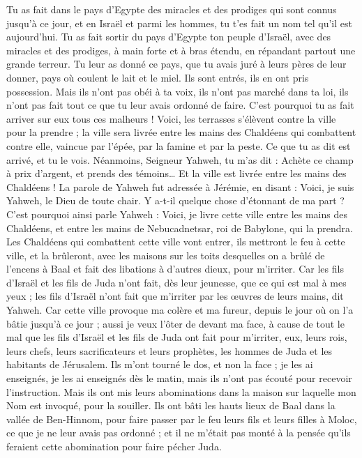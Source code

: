 \begin{multicols}{2}
Tu as fait dans le pays d'Egypte des miracles et des prodiges qui sont connus jusqu'à ce jour, et en Israël et parmi les hommes, tu t'es fait un nom tel qu'il est aujourd'hui.
Tu as fait sortir du pays d'Egypte ton peuple d'Israël, avec des miracles et des prodiges, à main forte et à bras étendu, en répandant partout une grande terreur.
Tu leur as donné ce pays, que tu avais juré à leurs pères de leur donner, pays où coulent le lait et le miel.
Ils sont entrés, ils en ont pris possession. Mais ils n'ont pas obéi à ta voix, ils n'ont pas marché dans ta loi, ils n'ont pas fait tout ce que tu leur avais ordonné de faire. C'est pourquoi tu as fait arriver sur eux tous ces malheurs !
Voici, les terrasses s'élèvent contre la ville pour la prendre ; la ville sera livrée entre les mains des Chaldéens qui combattent contre elle, vaincue par l'épée, par la famine et par la peste. Ce que tu as dit est arrivé, et tu le vois.
Néanmoins, Seigneur Yahweh, tu m'as dit : Achète ce champ à prix d'argent, et prends des témoins… Et la ville est livrée entre les mains des Chaldéens !
La parole de Yahweh fut adressée à Jérémie, en disant :
Voici, je suis Yahweh, le Dieu de toute chair. Y a-t-il quelque chose d'étonnant de ma part ?
C'est pourquoi ainsi parle Yahweh : Voici, je livre cette ville entre les mains des Chaldéens, et entre les mains de Nebucadnetsar, roi de Babylone, qui la prendra.
Les Chaldéens qui combattent cette ville vont entrer, ils mettront le feu à cette ville, et la brûleront, avec les maisons sur les toits desquelles on a brûlé de l'encens à Baal et fait des libations à d'autres dieux, pour m'irriter.
Car les fils d'Israël et les fils de Juda n'ont fait, dès leur jeunesse, que ce qui est mal à mes yeux ; les fils d'Israël n'ont fait que m'irriter par les œuvres de leurs mains, dit Yahweh.
Car cette ville provoque ma colère et ma fureur, depuis le jour où on l'a bâtie jusqu'à ce jour ; aussi je veux l'ôter de devant ma face,
à cause de tout le mal que les fils d'Israël et les fils de Juda ont fait pour m'irriter, eux, leurs rois, leurs chefs, leurs sacrificateurs et leurs prophètes, les hommes de Juda et les habitants de Jérusalem.
Ils m'ont tourné le dos, et non la face ; je les ai enseignés, je les ai enseignés dès le matin, mais ils n'ont pas écouté pour recevoir l'instruction.
Mais ils ont mis leurs abominations dans la maison sur laquelle mon Nom est invoqué, pour la souiller.
Ils ont bâti les hauts lieux de Baal dans la vallée de Ben-Hinnom, pour faire passer par le feu leurs fils et leurs filles à Moloc, ce que je ne leur avais pas ordonné ; et il ne m'était pas monté à la pensée qu'ils feraient cette abomination pour faire pécher Juda.

\end{multicols}
